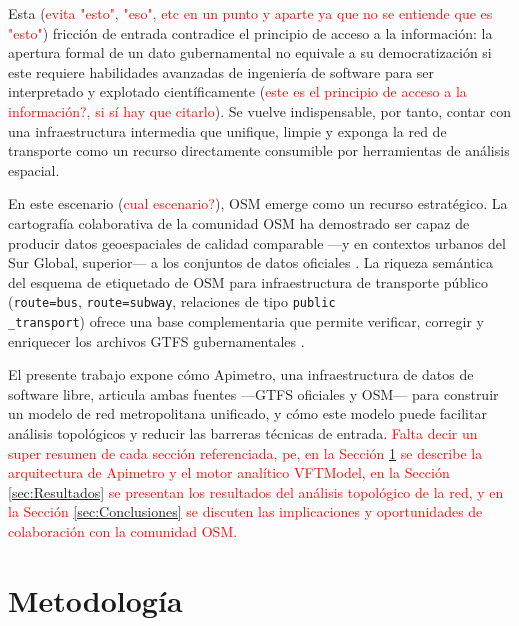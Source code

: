 \documentclass{isprs} %
\begin{document}
Esta (\textcolor{red}{evita "esto", "eso", etc en un punto y aparte ya que no se entiende que es "esto"}) fricción de entrada contradice el principio de acceso a la información: la apertura formal de un dato gubernamental no equivale a su democratización si este requiere habilidades avanzadas de ingeniería de software para ser interpretado y explotado científicamente (\textcolor{red}{este es el principio de acceso a la información?, si sí hay que citarlo}).  Se vuelve indispensable, por tanto, contar con una infraestructura intermedia que unifique, limpie y exponga la red de transporte como un recurso directamente consumible por herramientas de análisis espacial.

En este escenario (\textcolor{red}{cual escenario?}), OSM emerge como un recurso estratégico.  La cartografía colaborativa de la comunidad OSM ha demostrado ser capaz de producir datos geoespaciales de calidad comparable ---y en contextos urbanos del Sur Global, superior--- a los conjuntos de datos oficiales \citep{haklay2010good, barrington2017world}.  La riqueza semántica del esquema de etiquetado de OSM para infraestructura de transporte público (\texttt{route=bus}, \texttt{route=subway}, relaciones de tipo \texttt{public\\\_transport}) ofrece una base complementaria que permite verificar, corregir y enriquecer los archivos GTFS gubernamentales \citep{luxen2011realtime}.

El presente trabajo expone cómo Apimetro, una infraestructura de datos de software libre, articula ambas fuentes ---GTFS oficiales y OSM--- para construir un modelo de red metropolitana unificado, y cómo este modelo puede facilitar análisis topológicos y reducir las barreras técnicas de entrada. \textcolor{red}{Falta decir un super resumen de cada sección referenciada, pe, en la Sección \ref{sec:Metodologia} se describe la arquitectura de Apimetro y el motor analítico VFTModel, en la Sección \ref{sec:Resultados} se presentan los resultados del análisis topológico de la red, y en la Sección \ref{sec:Conclusiones} se discuten las implicaciones y oportunidades de colaboración con la comunidad OSM.}

\section{Metodología}
\label{sec:Metodologia}
\end{document}
